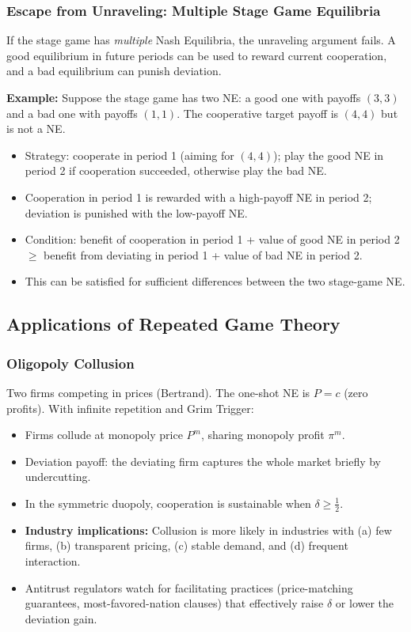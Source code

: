 \documentclass[hidelinks]{article}
\begin{document}
\subsubsection{Escape from Unraveling: Multiple Stage Game Equilibria}

If the stage game has \textit{multiple} Nash Equilibria, the unraveling argument fails. A good equilibrium in future periods can be used to reward current cooperation, and a bad equilibrium can punish deviation.

\textbf{Example:} Suppose the stage game has two NE: a good one with payoffs $(3,3)$ and a bad one with payoffs $(1,1)$. The cooperative target payoff is $(4,4)$ but is not a NE.

\begin{itemize}
    \item Strategy: cooperate in period 1 (aiming for $(4,4)$); play the good NE in period 2 if cooperation succeeded, otherwise play the bad NE.
    \item Cooperation in period 1 is rewarded with a high-payoff NE in period 2; deviation is punished with the low-payoff NE.
    \item Condition: benefit of cooperation in period 1 + value of good NE in period 2 $\geq$ benefit from deviating in period 1 + value of bad NE in period 2.
    \item This can be satisfied for sufficient differences between the two stage-game NE.
\end{itemize}

\subsection{Applications of Repeated Game Theory}

\subsubsection{Oligopoly Collusion}

Two firms competing in prices (Bertrand). The one-shot NE is $P = c$ (zero profits). With infinite repetition and Grim Trigger:

\begin{itemize}
    \item Firms collude at monopoly price $P^m$, sharing monopoly profit $\pi^m$.
    \item Deviation payoff: the deviating firm captures the whole market briefly by undercutting.
    \item In the symmetric duopoly, cooperation is sustainable when $\delta \geq \frac{1}{2}$.
    \item \textbf{Industry implications:} Collusion is more likely in industries with (a) few firms, (b) transparent pricing, (c) stable demand, and (d) frequent interaction.
    \item Antitrust regulators watch for facilitating practices (price-matching guarantees, most-favored-nation clauses) that effectively raise $\delta$ or lower the deviation gain.
\end{itemize}
\end{document}
